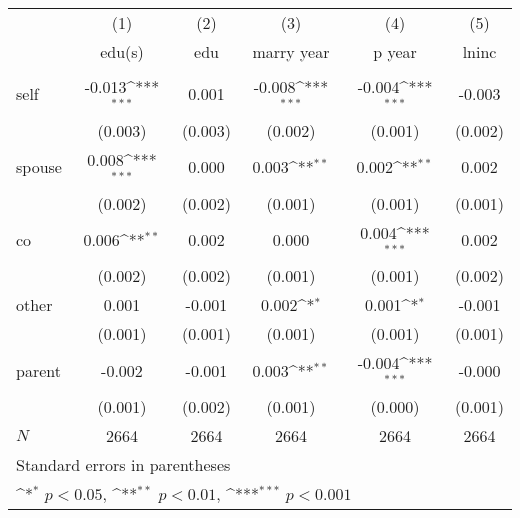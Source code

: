 \documentclass{article}
\begin{document}
  {
\def\sym#1{\ifmmode^{#1}\else\(^{#1}\)\fi}
\begin{tabular}{l*{5}{c}}
\hline\hline
            &\multicolumn{1}{c}{(1)}&\multicolumn{1}{c}{(2)}&\multicolumn{1}{c}{(3)}&\multicolumn{1}{c}{(4)}&\multicolumn{1}{c}{(5)}\\
            &\multicolumn{1}{c}{edu(s)} &\multicolumn{1}{c}{edu} &\multicolumn{1}{c}{marry year} &\multicolumn{1}{c}{p year} &\multicolumn{1}{c}{lninc} \\
\hline
      &                     &                     &                     &                     &                     \\
self  &      -0.013\sym{***}&       0.001         &      -0.008\sym{***}&      -0.004\sym{***}&      -0.003         \\
            &     (0.003)         &     (0.003)         &     (0.002)         &     (0.001)         &     (0.002)         \\
[1em]
spouse  &       0.008\sym{***}&       0.000         &       0.003\sym{**} &       0.002\sym{**} &       0.002         \\
            &     (0.002)         &     (0.002)         &     (0.001)         &     (0.001)         &     (0.001)         \\
[1em]
co  &       0.006\sym{**} &       0.002         &       0.000         &       0.004\sym{***}&       0.002         \\
            &     (0.002)         &     (0.002)         &     (0.001)         &     (0.001)         &     (0.002)         \\
[1em]
other  &       0.001         &      -0.001         &       0.002\sym{*}  &       0.001\sym{*}  &      -0.001         \\
            &     (0.001)         &     (0.001)         &     (0.001)         &     (0.001)         &     (0.001)         \\
[1em]
parent  &      -0.002         &      -0.001         &       0.003\sym{**} &      -0.004\sym{***}&      -0.000         \\
            &     (0.001)         &     (0.002)         &     (0.001)         &     (0.000)         &     (0.001)         \\
\hline
\(N\)       &        2664         &        2664         &        2664         &        2664         &        2664         \\
\hline\hline
\multicolumn{6}{l}{\footnotesize Standard errors in parentheses}\\
\multicolumn{6}{l}{\footnotesize \sym{*} \(p<0.05\), \sym{**} \(p<0.01\), \sym{***} \(p<0.001\)}\\
\end{tabular}
}
\vspace{\fill}
\end{document}
